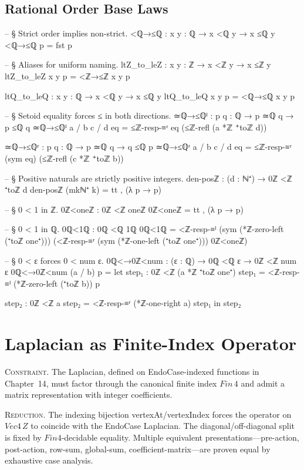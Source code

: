 \documentclass[11pt,a4paper]{book}
\def\mathrm#1{#1}%
\def\mathbb#1{#1}%
\def\texttt#1{#1}%
\begin{document}
\section{Rational Order Base Laws}

\begin{code}
-- § Strict order implies non-strict.
<ℚ→≤ℚ : {x y : ℚ} → x <ℚ y → x ≤ℚ y
<ℚ→≤ℚ p = fst p

-- § Aliases for uniform naming.
ltZ_to_leZ : {x y : ℤ} → x <ℤ y → x ≤ℤ y
ltZ_to_leZ {x} {y} p = <ℤ→≤ℤ {x} {y} p

ltQ_to_leQ : {x y : ℚ} → x <ℚ y → x ≤ℚ y
ltQ_to_leQ {x} {y} p = <ℚ→≤ℚ {x} {y} p

-- § Setoid equality forces ≤ in both directions.
≃ℚ→≤ℚˡ : {p q : ℚ} → p ≃ℚ q → p ≤ℚ q
≃ℚ→≤ℚˡ {a / b} {c / d} eq =
  ≤ℤ-resp-≡ʳ eq (≤ℤ-refl (a *ℤ ⁺toℤ d))

≃ℚ→≤ℚʳ : {p q : ℚ} → p ≃ℚ q → q ≤ℚ p
≃ℚ→≤ℚʳ {a / b} {c / d} eq =
  ≤ℤ-resp-≡ʳ (sym eq) (≤ℤ-refl (c *ℤ ⁺toℤ b))

-- § Positive naturals are strictly positive integers.
den-posℤ : (d : ℕ⁺) → 0ℤ <ℤ ⁺toℤ d
den-posℤ (mkℕ⁺ k) =
  tt , (λ p → p)

-- § 0 < 1 in ℤ.
0ℤ<oneℤ : 0ℤ <ℤ oneℤ
0ℤ<oneℤ =
  tt , (λ p → p)

-- § 0 < 1 in ℚ.
0ℚ<1ℚ : 0ℚ <ℚ 1ℚ
0ℚ<1ℚ =
  <ℤ-resp-≡ˡ (sym (*ℤ-zero-left (⁺toℤ one⁺)))
    (<ℤ-resp-≡ʳ (sym (*ℤ-one-left (⁺toℤ one⁺)))
      0ℤ<oneℤ)

-- § 0 < ε forces 0 < num ε.
0ℚ<→0ℤ<num : (ε : ℚ) → 0ℚ <ℚ ε → 0ℤ <ℤ num ε
0ℚ<→0ℤ<num (a / b) p =
  let step₁ : 0ℤ <ℤ (a *ℤ ⁺toℤ one⁺)
      step₁ = <ℤ-resp-≡ˡ (*ℤ-zero-left (⁺toℤ b)) p

      step₂ : 0ℤ <ℤ a
      step₂ = <ℤ-resp-≡ʳ (*ℤ-one-right a) step₁
  in
  step₂
\end{code}

\chapter{Laplacian as Finite-Index Operator}

\textsc{Constraint.}
The Laplacian, defined on \texttt{EndoCase}-indexed functions in Chapter~14,
must factor through the canonical finite index $\mathrm{Fin}\,4$ and admit a
matrix representation with integer coefficients.

\textsc{Reduction.}
The indexing bijection \texttt{vertexAt}/\texttt{vertexIndex} forces the operator
on $\mathrm{Vec4}\,\mathbb{Z}$ to coincide with the \texttt{EndoCase} Laplacian.
The diagonal/off-diagonal split is fixed by $\mathrm{Fin4}$-decidable equality.
Multiple equivalent presentations---pre-action, post-action, row-sum, global-sum,
coefficient-matrix---are proven equal by exhaustive case analysis.
\end{document}
